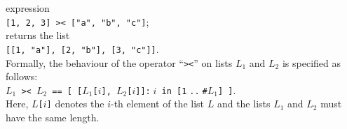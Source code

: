 \begin{enumerate}
      expression      
      \\[0.2cm]
      \hspace*{1.3cm}
      \texttt{[1, 2, 3] >< ["a", "b", "c"]};
      \\[0.2cm]
      returns the list
      \\[0.2cm]
      \hspace*{1.3cm}
      \texttt{[[1, "a"], [2, "b"], [3, "c"]]}.
      \\[0.2cm]
      Formally, the behaviour of the operator ``\texttt{><}'' on lists $L_1$ and $L_2$ is specified as follows:
      \\[0.2cm]
      \hspace*{1.3cm}
      \texttt{$L_1$ >< $L_2$ == [ [$L_1$[$i$], $L_2$[$i$]]:$\;i$ in [1$\;$..$\;$\#$L_1$] ]}.
      \\[0.2cm]
      Here, \texttt{$L$[$i$]} denotes the $i$-th element of the list $L$ and the lists $L_1$ and
      $L_2$ must have the same length.
\end{enumerate}

